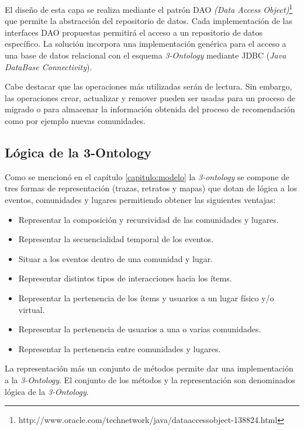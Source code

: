 El diseño de esta capa se realiza mediante el patrón DAO \textit{(Data Access Object)}\footnote{http://www.oracle.com/technetwork/java/dataaccessobject-138824.html} que permite la abstracción del repositorio de datos. Cada implementación de las interfaces DAO propuestas permitirá el acceso a un repositorio de datos específico. La solución incorpora una implementación genérica para el acceso a una base de datos relacional con el esquema \textit{3-Ontology} mediante JDBC (\textit{Java DataBase Connectivity}).

%

Cabe destacar que las operaciones más utilizadas serán de lectura. Sin embargo, las operaciones crear, actualizar y remover pueden ser usadas para un proceso de migrado o para almacenar la información obtenida del proceso de recomendación como por ejemplo nuevas comunidades.

\subsection{L\'ogica de la 3-Ontology}

Como se mencionó en el capítulo \ref{capitulo:modelo} la \textit{3-ontology} se compone de tres formas de representación (trazas, retratos y mapas) que dotan de lógica a los eventos, comunidades y lugares permitiendo obtener las siguientes ventajas:

\begin{itemize}
	\item Representar la composición y recursividad de las comunidades y lugares.
	\item Representar la secuencialidad temporal de los eventos.
	\item Situar a los eventos dentro de una comunidad y lugar.
	\item Representar distintos tipos de interacciones hacia los ítems.
	\item Representar la pertenencia de los ítems y usuarios a un lugar físico y/o virtual.
	\item Representar la pertenencia de usuarios a una o varias comunidades.
	\item Representar la pertenencia entre comunidades y lugares.
\end{itemize}

La representación más un conjunto de métodos permite dar una implementación a la \textit{3-Ontology}. El conjunto de los métodos y la representación son denominados lógica de la \textit{3-Ontology}.


